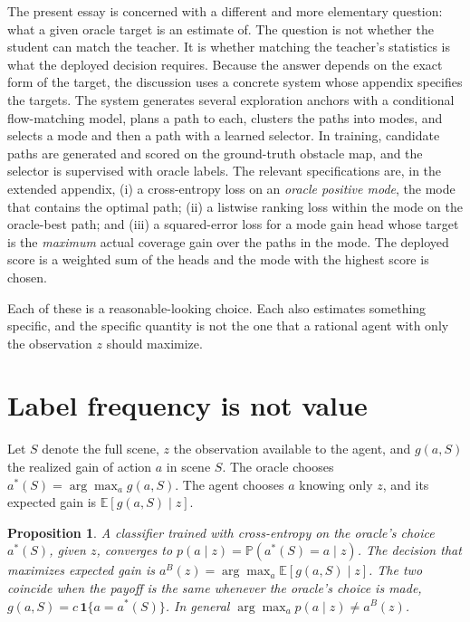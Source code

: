 \documentclass[11pt]{article}
\newtheorem{proposition}{Proposition}
\theoremstyle{definition}
\newcommand{\E}{\mathbb{E}}
\renewcommand{\Pr}{\mathbb{P}}
\begin{document}
The present essay is concerned with a different and more elementary question: what a given oracle target is an estimate of. The question is not whether the student can match the teacher. It is whether matching the teacher's statistics is what the deployed decision requires. Because the answer depends on the exact form of the target, the discussion uses a concrete system whose appendix specifies the targets. The system \citep{li2026} generates several exploration anchors with a conditional flow-matching model, plans a path to each, clusters the paths into modes, and selects a mode and then a path with a learned selector. In training, candidate paths are generated and scored on the ground-truth obstacle map, and the selector is supervised with oracle labels. The relevant specifications are, in the extended appendix, (i) a cross-entropy loss on an \emph{oracle positive mode}, the mode that contains the optimal path; (ii) a listwise ranking loss within the mode on the oracle-best path; and (iii) a squared-error loss for a mode gain head whose target is the \emph{maximum} actual coverage gain over the paths in the mode. The deployed score is a weighted sum of the heads and the mode with the highest score is chosen.

Each of these is a reasonable-looking choice. Each also estimates something specific, and the specific quantity is not the one that a rational agent with only the observation $z$ should maximize.

\section{Label frequency is not value}
\label{sec:label}

Let $S$ denote the full scene, $z$ the observation available to the agent, and $g(a,S)$ the realized gain of action $a$ in scene $S$. The oracle chooses $a^\ast(S)=\arg\max_a g(a,S)$. The agent chooses $a$ knowing only $z$, and its expected gain is $\E[g(a,S)\mid z]$.

\begin{proposition}
A classifier trained with cross-entropy on the oracle's choice $a^\ast(S)$, given $z$, converges to $p(a\mid z)=\Pr(a^\ast(S)=a\mid z)$. The decision that maximizes expected gain is $a^{B}(z)=\arg\max_a\E[g(a,S)\mid z]$. The two coincide when the payoff is the same whenever the oracle's choice is made, $g(a,S)=c\,\mathbf 1\{a=a^\ast(S)\}$. In general $\arg\max_a p(a\mid z)\neq a^B(z)$.
\end{proposition}
\end{document}
